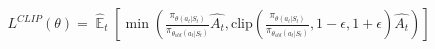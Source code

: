 \documentclass[preview]{standalone}
\begin{document}
\begin{align*}
L^{CLIP}(\theta) = \hat{\mathop{\mathbb{E}}}_t \left[ \min ( \frac{\pi_{\theta(a_t|S_t)}}{\pi_{\theta_{old}(a_t|S_t)}} \hat{A_t} , \text{clip} ( \frac{\pi_{\theta(a_t|S_t)}}{\pi_{\theta_{old}(a_t|S_t)}} , 1-\epsilon, 1+\epsilon ) \hat{A_t} ) \right]
\end{align*}
\end{document}
